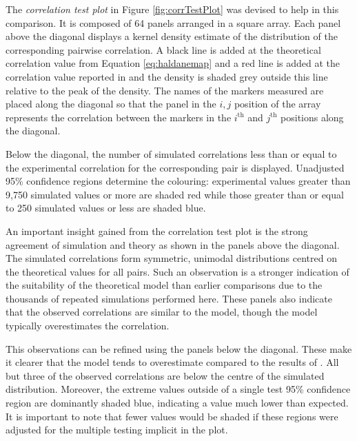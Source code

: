 \documentclass{article}
\begin{document}
The \emph{correlation test plot} in Figure \ref{fig:corrTestPlot} was devised to help in this comparison. It is composed of 64 panels arranged in a square array. Each panel above the diagonal displays a kernel density estimate of the distribution of the corresponding pairwise correlation. A black line is added at the theoretical correlation value from Equation \ref{eq:haldanemap} and a red line is added at the correlation value reported in \cite{cheverud2001} and the density is shaded grey outside this line relative to the peak of the density. The names of the markers measured are placed along the diagonal so that the panel in the $i, j$ position of the array represents the correlation between the markers in the $i^{\text{th}}$ and $j^{\text{th}}$ positions along the diagonal.

Below the diagonal, the number of simulated correlations less than or equal to the experimental correlation for the corresponding pair is displayed. Unadjusted 95\% confidence regions determine the colouring: experimental values greater than 9,750 simulated values or more are shaded red while those greater than or equal to 250 simulated values or less are shaded blue.

An important insight gained from the correlation test plot is the strong agreement of simulation and theory as shown in the panels above the diagonal. The simulated correlations form symmetric, unimodal distributions centred on the theoretical values for all pairs. Such an observation is a stronger indication of the suitability of the theoretical model than earlier comparisons due to the thousands of repeated simulations performed here. These panels also indicate that the observed correlations are similar to the model, though the model typically overestimates the correlation.

This observations can be refined using the panels below the diagonal. These make it clearer that the model tends to overestimate compared to the results of \cite{cheverud2001}. All but three of the observed correlations are below the centre of the simulated distribution. Moreover, the extreme values outside of a single test 95\% confidence region are dominantly shaded blue, indicating a value much lower than expected. It is important to note that fewer values would be shaded if these regions were adjusted for the multiple testing implicit in the plot.



\end{document}

